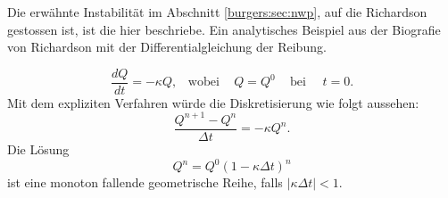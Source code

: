 	\medskip

	Die erw\"ahnte Instabilit\"at im Abschnitt \ref{burgers:sec:nwp}, auf die Richardson gestossen ist, ist die hier beschriebe.
%
	Ein analytisches Beispiel aus der Biografie von Richardson \cite{burgers:lynch_2014} mit der Differentialgleichung der Reibung.

	\begin{equation}
		\frac{dQ}{dt} = - \kappa Q, \,\,\,\,\, \text{wobei} \, \,\,\,\,\,\, Q=Q^0 \,\,\,\,\,\,\, \text{bei} \,\,\,\,\,\,\,\, t=0.
	\end{equation}
	Mit dem expliziten Verfahren w\"urde die Diskretisierung wie folgt aussehen:
	\begin{equation}
		\frac{Q^{n+1}-Q^n}{\Delta t} = - \kappa Q^n.
	\end{equation}
	Die L\"osung
		\begin{equation}
			Q^n = Q^0(1-\kappa \Delta t)^n
		\end{equation}
	ist eine monoton fallende geometrische Reihe, falls $|\kappa \Delta t| <1$.

